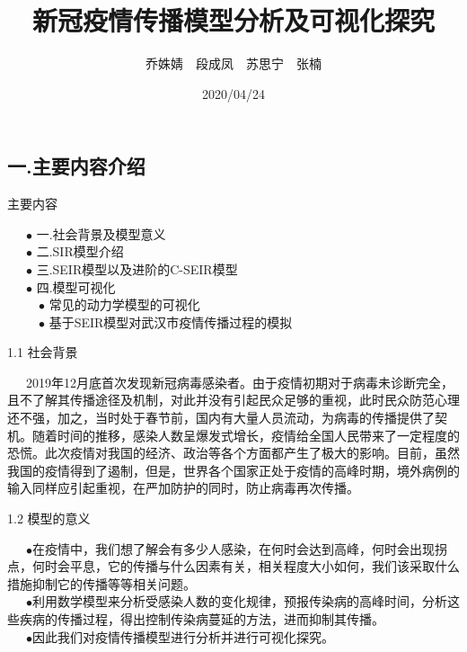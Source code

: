 \documentclass[
  ignorenonframetext,
]{beamer}
\title{新冠疫情传播模型分析及可视化探究}
\author{乔姝婧 段成凤 苏思宁 张楠}
\date{2020/04/24}
\begin{document}
\frame{\titlepage}

\hypertarget{section}{%
\subsection{一.主要内容介绍}\label{section}}

\begin{frame}{主要内容}
\protect\hypertarget{section-1}{}

  \(\bullet\) 一.社会背景及模型意义\\
  \(\bullet\) 二.SIR模型介绍\\
  \(\bullet\) 三.SEIR模型以及进阶的C-SEIR模型\\
  \(\bullet\) 四.模型可视化\\
   \(\bullet\) 常见的动力学模型的可视化\\
   \(\bullet\) 基于SEIR模型对武汉市疫情传播过程的模拟

\end{frame}

\begin{frame}{1.1 社会背景}
\protect\hypertarget{section-2}{}

  2019年12月底首次发现新冠病毒感染者。由于疫情初期对于病毒未诊断完全，且不了解其传播途径及机制，对此并没有引起民众足够的重视，此时民众防范心理还不强，加之，当时处于春节前，国内有大量人员流动，为病毒的传播提供了契机。随着时间的推移，感染人数呈爆发式增长，疫情给全国人民带来了一定程度的恐慌。此次疫情对我国的经济、政治等各个方面都产生了极大的影响。目前，虽然我国的疫情得到了遏制，但是，世界各个国家正处于疫情的高峰时期，境外病例的输入同样应引起重视，在严加防护的同时，防止病毒再次传播。

\end{frame}

\begin{frame}{1.2 模型的意义}
\protect\hypertarget{section-3}{}

  \(\bullet\)在疫情中，我们想了解会有多少人感染，在何时会达到高峰，何时会出现拐点，何时会平息，它的传播与什么因素有关，相关程度大小如何，我们该采取什么措施抑制它的传播等等相关问题。\\
  \(\bullet\)利用数学模型来分析受感染人数的变化规律，预报传染病的高峰时间，分析这些疾病的传播过程，得出控制传染病蔓延的方法，进而抑制其传播。\\
  \(\bullet\)因此我们对疫情传播模型进行分析并进行可视化探究。

\end{frame}
\end{document}
